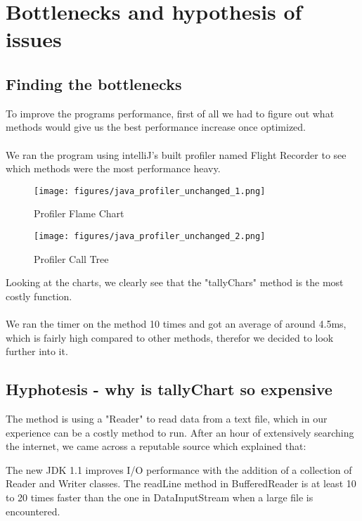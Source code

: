 \section{Bottlenecks and hypothesis of issues}


\subsection{Finding the bottlenecks}
To improve the programs performance, first of all we had to figure out what methods would give us the best performance increase once optimized.\\\\
We ran the program using intelliJ's built profiler named Flight Recorder to see which methods were the most performance heavy.

\begin{figure}[h]
    \caption{Profiler Flame Chart}
    \texttt{[image: figures/java\_profiler\_unchanged\_1.png]}
    \label{fig:flame-chart-unchanged}
\end{figure}

\begin{figure}[h]
    \caption{Profiler Call Tree}
    \texttt{[image: figures/java\_profiler\_unchanged\_2.png]}
    \label{fig:call-tree-unchanged}
\end{figure}

Looking at the charts, we clearly see that the "tallyChars" method  is the most costly function.\\\\
We ran the timer on the method 10 times and got an average of around 4.5ms, which is fairly high compared to other methods, therefor we decided to look further into it.

\newpage

\subsection{Hyphotesis - why is tallyChart so expensive}
The method is using a "Reader" to read data from a text file, which in our experience can be a costly method to run.
After an hour of extensively searching the internet, we came across a reputable source which explained that:

\begin{displayquote}
The new JDK 1.1 improves I/O performance with the addition of a collection of Reader and Writer classes. The readLine method in BufferedReader is at least 10 to 20 times faster than the one in DataInputStream when a large file is encountered. \parencite{how-to-improve-javas-io-performance}
\end{displayquote}

